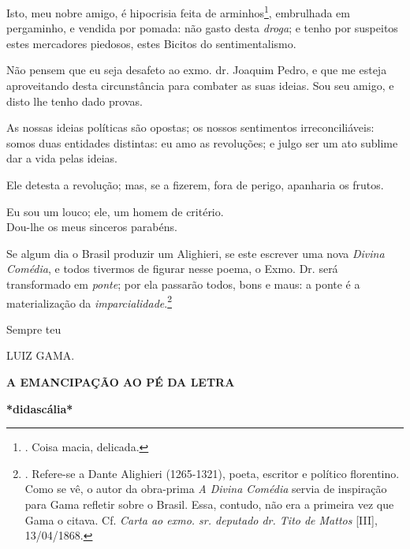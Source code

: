 Isto, meu nobre amigo, é hipocrisia feita de arminhos\footnote{. Coisa
  macia, delicada.}, embrulhada em pergaminho, e vendida por pomada: não
gasto desta \emph{droga}; e tenho por suspeitos estes mercadores
piedosos, estes Bicitos do sentimentalismo.

Não pensem que eu seja desafeto ao exmo. dr. Joaquim Pedro, e que me
esteja aproveitando desta circunstância para combater as suas ideias.
Sou seu amigo, e disto lhe tenho dado provas.

As nossas ideias políticas são opostas; os nossos sentimentos
irreconciliáveis: somos duas entidades distintas: eu amo as revoluções;
e julgo ser um ato sublime dar a vida pelas ideias.

Ele detesta a revolução; mas, se a fizerem, fora de perigo, apanharia os
frutos.

Eu sou um louco; ele, um homem de critério.\\
Dou-lhe os meus sinceros parabéns.

Se algum dia o Brasil produzir um Alighieri, se este escrever uma nova
\emph{Divina Comédia}, e todos tivermos de figurar nesse poema, o Exmo.
Dr. será transformado em \emph{ponte}; por ela passarão todos, bons e
maus: a ponte é a materialização da \emph{imparcialidade}.\footnote{.
  Refere-se a Dante Alighieri (1265-1321), poeta, escritor e político
  florentino. Como se vê, o autor da obra-prima \emph{A Divina Comédia}
  servia de inspiração para Gama refletir sobre o Brasil. Essa, contudo,
  não era a primeira vez que Gama o citava. Cf. \emph{Carta ao exmo. sr.
  deputado dr. Tito de Mattos} {[}III{]}, 13/04/1868.}

Sempre teu

LUIZ GAMA.

\textbf{A EMANCIPAÇÃO AO PÉ DA LETRA}

\textbf{*didascália*}

